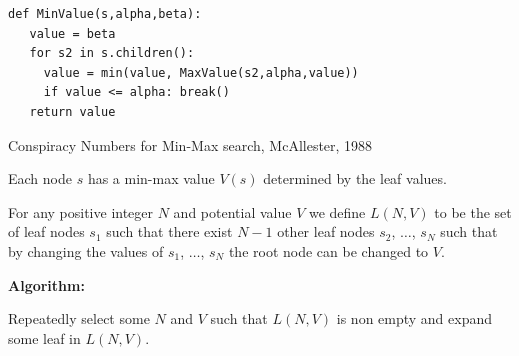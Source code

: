{\begin{verbatim}
def MinValue(s,alpha,beta):
   value = beta
   for s2 in s.children():
     value = min(value, MaxValue(s2,alpha,value))
     if value <= alpha: break()
   return value
\end{verbatim}


Conspiracy Numbers for Min-Max search, McAllester, 1988

\vfill
Each node $s$ has a min-max value $V(s)$ determined by the leaf values.

\vfill
For any positive integer $N$ and potential value $V$ we define $L(N,V)$ to be the set of leaf nodes $s_1$ such that
there exist $N-1$ other leaf nodes $s_2$, $\ldots$, $s_N$ such that by changing the values of $s_1$, $\ldots$, $s_N$ the root node
can be changed to $V$.


\vfill
{\bf Algorithm:}


\vfill
Repeatedly select some $N$ and $V$ such that $L(N,V)$ is non empty and expand some leaf in $L(N,V)$.



}



